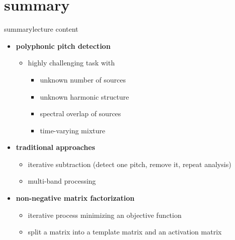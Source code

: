     \section{summary}
        \begin{frame}{summary}{lecture content}
            \begin{itemize}
                \item   \textbf{polyphonic pitch detection}
                    \begin{itemize}
                        \item   highly challenging task with
                            \begin{itemize}
                                \item   unknown number of sources
                                \item   unknown harmonic structure
                                \item   spectral overlap of sources
                                \item   time-varying mixture
                            \end{itemize}
                    \end{itemize}
                \bigskip
                \item   \textbf{traditional approaches}
                    \begin{itemize}
                        \item   iterative subtraction (detect one pitch, remove it, repeat analysis)
                        \item   multi-band processing
                    \end{itemize}
                \bigskip
                \item   \textbf{non-negative matrix factorization}
                    \begin{itemize}
                        \item   iterative process minimizing an objective function
                        \item   split a matrix into a template matrix and an activation matrix
                    \end{itemize}
           \end{itemize}
        \end{frame}

